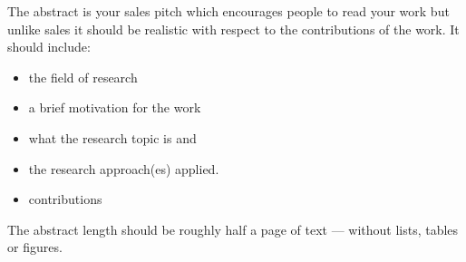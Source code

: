 The abstract is your sales pitch which encourages people to read your work but unlike sales it should be realistic with respect to the contributions of the work. It should include:
\begin{itemize}
\item the field of research
\item a brief motivation for the work
\item what the research topic is and
\item the research approach(es) applied. 
\item contributions
\end{itemize}

The abstract length should be roughly half a page of text --- without lists, tables or figures.  